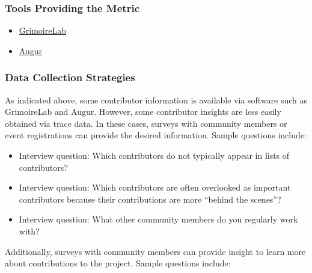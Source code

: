 \hypertarget{tools-providing-the-metric}{%
\subsubsection{Tools Providing the
Metric}\label{tools-providing-the-metric}}

\begin{itemize}
\tightlist
\item
  \href{https://chaoss.github.io/grimoirelab/}{GrimoireLab}
\item
  \href{http://augur.osshealth.io/api_docs/\#api-Evolution-Contributors_Repo_}{Augur}
\end{itemize}

\hypertarget{data-collection-strategies}{%
\subsubsection{Data Collection
Strategies}\label{data-collection-strategies}}

As indicated above, some contributor information is available via
software such as GrimoireLab and Augur. However, some contributor
insights are less easily obtained via trace data. In these cases,
surveys with community members or event registrations can provide the
desired information. Sample questions include:

\begin{itemize}
\tightlist
\item
  Interview question: Which contributors do not typically appear in
  lists of contributors?
\item
  Interview question: Which contributors are often overlooked as
  important contributors because their contributions are more ``behind
  the scenes''?
\item
  Interview question: What other community members do you regularly work
  with?
\end{itemize}

Additionally, surveys with community members can provide insight to
learn more about contributions to the project. Sample questions include:

